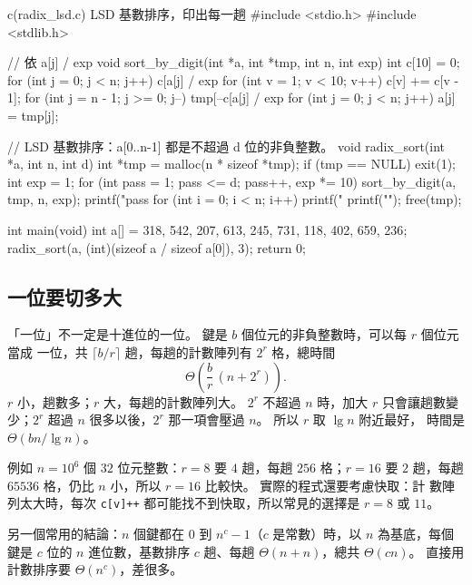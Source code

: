 \begin{example}[label=ex:lin-radix]{c}{(radix\_lsd.c) LSD 基數排序，印出每一趟}
#include <stdio.h>
#include <stdlib.h>

// 依 a[j] / exp %
void sort_by_digit(int *a, int *tmp, int n, int exp)
{
    int c[10] = {0};
    for (int j = 0; j < n; j++)
        c[a[j] / exp %
    for (int v = 1; v < 10; v++)
        c[v] += c[v - 1];
    for (int j = n - 1; j >= 0; j--)
        tmp[--c[a[j] / exp %
    for (int j = 0; j < n; j++)
        a[j] = tmp[j];
}

// LSD 基數排序：a[0..n-1] 都是不超過 d 位的非負整數。
void radix_sort(int *a, int n, int d)
{
    int *tmp = malloc(n * sizeof *tmp);
    if (tmp == NULL)
        exit(1);
    int exp = 1;
    for (int pass = 1; pass <= d; pass++, exp *= 10) {
        sort_by_digit(a, tmp, n, exp);
        printf("pass %
        for (int i = 0; i < n; i++)
            printf(" %
        printf("\n");
    }
    free(tmp);
}

int main(void)
{
    int a[] = {318, 542, 207, 613, 245, 731, 118, 402, 659, 236};
    radix_sort(a, (int)(sizeof a / sizeof a[0]), 3);
    return 0;
}
\end{example}

\subsection{一位要切多大}

「一位」不一定是十進位的一位。 鍵是 $b$ 個位元的非負整數時，可以每 $r$ 個位元當成
一位，共 $\lceil b/r \rceil$ 趟，每趟的計數陣列有 $2^r$ 格，總時間
\[
\Theta\!\left( \frac{b}{r}\,(n + 2^r) \right).
\]
$r$ 小，趟數多；$r$ 大，每趟的計數陣列大。 $2^r$ 不超過 $n$ 時，加大 $r$ 只會讓趟數變
少；$2^r$ 超過 $n$ 很多以後，$2^r$ 那一項會壓過 $n$。 所以 $r$ 取 $\lg n$ 附近最好，
時間是 $\Theta(bn / \lg n)$。

例如 $n = 10^6$ 個 $32$ 位元整數：$r = 8$ 要 $4$ 趟，每趟 $256$ 格；$r = 16$ 要 $2$
趟，每趟 $65536$ 格，仍比 $n$ 小，所以 $r = 16$ 比較快。 實際的程式還要考慮快取：計
數陣列太大時，每次 \texttt{c[v]++} 都可能找不到快取，所以常見的選擇是 $r = 8$ 或
$11$。

另一個常用的結論：$n$ 個鍵都在 $0$ 到 $n^c - 1$（$c$ 是常數）時，以 $n$ 為基底，每個
鍵是 $c$ 位的 $n$ 進位數，基數排序 $c$ 趟、每趟 $\Theta(n + n)$，總共 $\Theta(cn)$。
直接用計數排序要 $\Theta(n^c)$，差很多。

